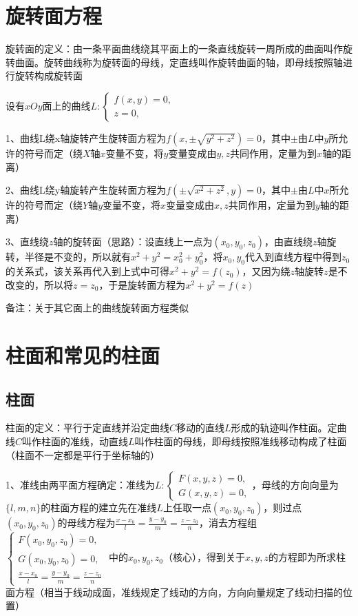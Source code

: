 \section{旋转面方程}

旋转面的定义：由一条平面曲线绕其平面上的一条直线旋转一周所成的曲面叫作旋转曲面。旋转曲线称为旋转面的母线，定直线叫作旋转曲面的轴，即母线按照轴进行旋转构成旋转面

设有$x O y$面上的曲线$L:\left\{\begin{array}{l}f(x, y)=0, \\ z=0,\end{array}\right.$

1、曲线L绕x轴旋转产生旋转面方程为$f\left(x, \pm \sqrt{y^{2}+z^{2}}\right)=0$，其中$\pm$由$L$中$y$所允许的符号而定（绕$X$轴$x$变量不变，将$y$变量变成由$y,z$共同作用，定量为到$x$轴的距离）

2、曲线L绕y轴旋转产生旋转面方程为$f\left(\pm \sqrt{x^{2}+z^{2}}, y\right)=0$，其中$\pm$由$L$中$x$所允许的符号而定（绕$Y$轴$y$变量不变，将$x$变量变成由$x,z$共同作用，定量为到$y$轴的距离）

3、直线绕$z$轴的旋转面（思路）：设直线上一点为$\left(x_{0}, y_{0}, z_{0}\right)$，由直线绕$z$轴旋转，半径是不变的，所以就有$x^2+y^2 = x_{0}^2+y_{0}^2$，将$x_{0}, y_{0}$代入到直线方程中得到$z_{0}$的关系式，该关系再代入到上式中可得$x^2+y^2 = f(z_{0})$，又因为绕$z$轴旋转$z$是不改变的，所以将$z=z_{0}$，于是旋转面方程为$x^2+y^2 = f(z)$

备注：关于其它面上的曲线旋转面方程类似

\section{柱面和常见的柱面}



\subsection{柱面}

柱面的定义：平行于定直线并沿定曲线$C$移动的直线$L$形成的轨迹叫作柱面。定曲线$C$叫作柱面的准线，动直线$L$叫作柱面的母线，即母线按照准线移动构成了柱面（柱面不一定都是平行于坐标轴的）

1、准线由两平面方程确定：准线为$L:\left\{\begin{array}{l}F(x, y, z)=0, \\ G(x, y, z)=0,\end{array}\right.$，母线的方向向量为$\{l, m, n\}$的柱面方程的建立先在准线$L$上任取一点$\left(x_{0}, y_{0}, z_{0}\right)$，则过点$\left(x_{0}, y_{0}, z_{0}\right)$的母线方程为$\frac{x-x_{0}}{l}=\frac{y-y_{0}}{m}=\frac{z-z_{0}}{n}$，消去方程组$\left\{\begin{array}{l}F\left(x_{0}, y_{0}, z_{0}\right)=0, \\ G\left(x_{0}, y_{0}, z_{0}\right)=0, \\ \frac{x-x_{0}}{l}=\frac{y-y_{0}}{m}=\frac{z-z_{0}}{n}\end{array}\right.$ 中的$x_{0}, y_{0}, z_{0}$（核心），得到关于$x, y, z$的方程即为所求柱面方程（相当于线动成面，准线规定了线动的方向，方向向量规定了线动扫描的位置）

